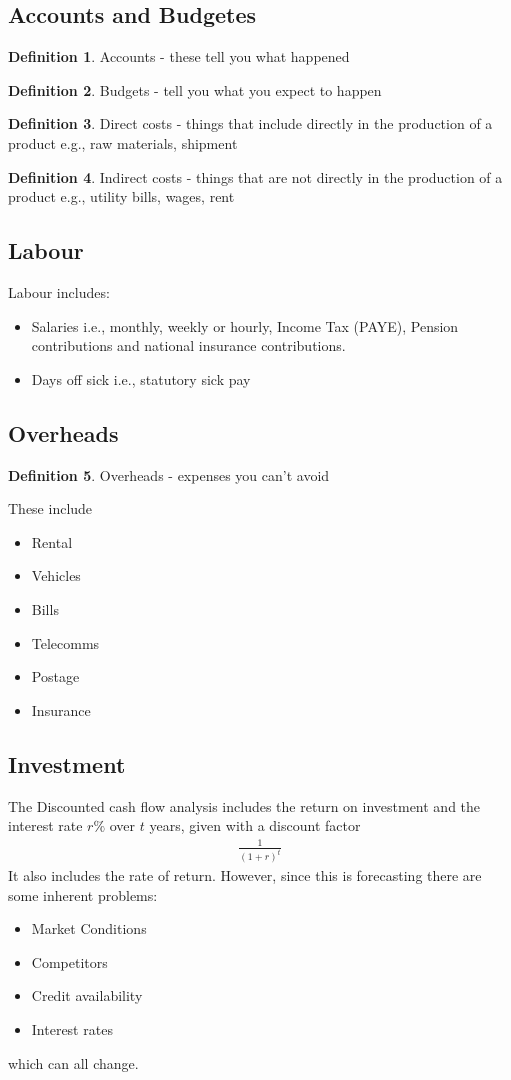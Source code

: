 \documentclass[a4paper]{article}
\theoremstyle{plain}
\theoremstyle{definition}
\newtheorem{defn}{Definition}[section]
\theoremstyle{remark}
\begin{document}
\subsection{Accounts and Budgetes}
\begin{defn}
	Accounts - these tell you what happened
\end{defn}
\begin{defn}
	Budgets - tell you what you expect to happen
\end{defn}
\begin{defn}
	Direct costs - things that include directly in the production of a product e.g., raw materials, shipment
\end{defn}
\begin{defn}
	Indirect costs - things that are not directly in the production of a product e.g., utility bills, wages, rent
\end{defn}
\subsection{Labour}
Labour includes:
\begin{itemize}
	\item Salaries i.e., monthly, weekly or hourly, Income Tax (PAYE), Pension contributions and national insurance contributions.
	\item Days off sick i.e., statutory sick pay
\end{itemize}
		\subsection{Overheads}
		\begin{defn}
			Overheads - expenses you can't avoid	
		\end{defn}
		These include
		\begin{itemize}
			\item Rental
			\item Vehicles
			\item Bills
			\item Telecomms
			\item Postage
			\item Insurance
		\end{itemize}
		\subsection{Investment}
		The Discounted cash flow analysis includes the return on investment and the interest rate $r\%$ over $t$ years, given with a discount factor
		\begin{align*}
			\frac{1}{(1+r)^{t}}
		\end{align*}
It also includes the rate of return. However, since this is forecasting there are some inherent problems:
\begin{itemize}
	\item Market Conditions
	\item Competitors
	\item Credit availability
	\item Interest rates
\end{itemize}
which can all change.
\end{document}

